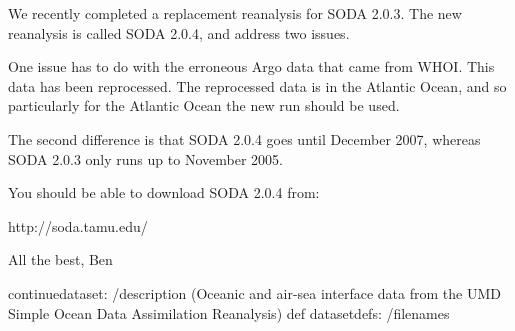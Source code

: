 We recently completed a replacement reanalysis for SODA 2.0.3.
The new reanalysis is called SODA 2.0.4, and address two issues.

    One issue has to do with the erroneous Argo data that came from
WHOI.  This data has been reprocessed.  The reprocessed data is
in the Atlantic Ocean, and so particularly for the Atlantic Ocean the
new run should be used.

    The second difference is that SODA 2.0.4 goes until December 2007,
whereas SODA 2.0.3 only runs up to November 2005.

    You should be able to download SODA 2.0.4 from:

                  http://soda.tamu.edu/

All the best,
Ben
\begin{ingrid}
continuedataset:
/description (Oceanic and air-sea interface data from the UMD Simple Ocean Data Assimilation Reanalysis) def
datasetdefs:
/filenames
{

}
\end{ingrid}
